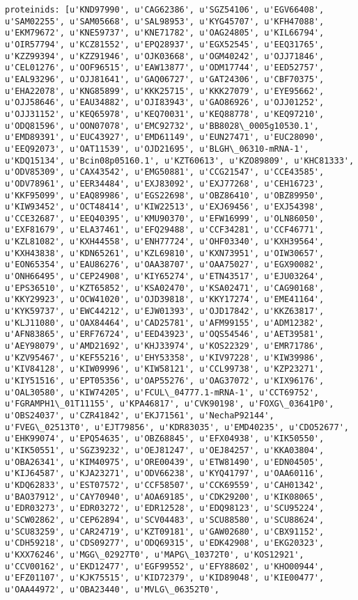 \documentclass[11pt]{article}
\begin{document}
\begin{Verbatim}[commandchars=\\\{\}]
proteinids: [u'KND97990', u'CAG62386', u'SGZ54106', u'EGV66408', u'SAM02255', u'SAM05668', u'SAL98953', u'KYG45707', u'KFH47088', u'EKM79672', u'KNE59737', u'KNE71782', u'OAG24805', u'KIL66794', u'OIR57794', u'KCZ81552', u'EPQ28937', u'EGX52545', u'EEQ31765', u'KZZ99394', u'KZZ91946', u'OJK03668', u'OGM40242', u'OJJ71846', u'CEL01276', u'OOF96515', u'EAW13877', u'ODM17744', u'EED52757', u'EAL93296', u'OJJ81641', u'GAQ06727', u'GAT24306', u'CBF70375', u'EHA22078', u'KNG85899', u'KKK25715', u'KKK27079', u'EYE95662', u'OJJ58646', u'EAU34882', u'OJI83943', u'GAO86926', u'OJJ01252', u'OJJ31152', u'KEQ65978', u'KEQ70031', u'KEQ88778', u'KEQ97210', u'ODQ81596', u'OON07078', u'EMC92732', u'BB8028\_0005g10530.1', u'EMD89391', u'EUC43927', u'EMD61149', u'EUN27471', u'EUC28090', u'EEQ92073', u'OAT11539', u'OJD21695', u'BLGH\_06310-mRNA-1', u'KDQ15134', u'Bcin08p05160.1', u'KZT60613', u'KZO89809', u'KHC81333', u'ODV85309', u'CAX43542', u'EMG50881', u'CCG21547', u'CCE43585', u'ODV78961', u'EER34484', u'EXJ83092', u'EXJ77268', u'CEH16723', u'KKF95099', u'EAQ89986', u'EGS22698', u'OBZ86410', u'OBZ89950', u'KIW93452', u'OCT48414', u'KIW22513', u'EXJ69456', u'EXJ54398', u'CCE32687', u'EEQ40395', u'KMU90370', u'EFW16999', u'OLN86050', u'EXF81679', u'ELA37461', u'EFQ29488', u'CCF34281', u'CCF46771', u'KZL81082', u'KXH44558', u'ENH77724', u'OHF03340', u'KXH39564', u'KXH43838', u'KDN65261', u'KZL69810', u'KXN73951', u'OIW30657', u'EON65354', u'EAU86276', u'OAA38707', u'OAA75027', u'EGX90082', u'ONH66495', u'CEP24908', u'KIY65274', u'ETN43517', u'EJU03264', u'EPS36510', u'KZT65852', u'KSA02470', u'KSA02471', u'CAG90168', u'KKY29923', u'OCW41020', u'OJD39818', u'KKY17274', u'EME41164', u'KYK59737', u'EWC44212', u'EJW01393', u'OJD17842', u'KKZ63817', u'KLJ11080', u'OAX84464', u'CAD25781', u'AFM99155', u'ADM12382', u'AFN83865', u'ERF76724', u'EED43923', u'OQS54546', u'AET39581', u'AEY98079', u'AMD21692', u'KHJ33974', u'KOS22329', u'EMR71786', u'KZV95467', u'KEF55216', u'EHY53358', u'KIV97228', u'KIW39986', u'KIV84128', u'KIW09996', u'KIW58121', u'CCL99738', u'KZP23271', u'KIY51516', u'EPT05356', u'OAP55276', u'OAG37072', u'KIX96176', u'OAL30580', u'KIW74205', u'FCUL\_04777.1-mRNA-1', u'CCT69752', u'FGRAMPH1\_01T11155', u'KPA46817', u'CVK90198', u'FOXG\_03641P0', u'OBS24037', u'CZR41842', u'EKJ71561', u'NechaP92144', u'FVEG\_02513T0', u'EJT79856', u'KDR83035', u'EMD40235', u'CDO52677', u'EHK99074', u'EPQ54635', u'OBZ68845', u'EFX04938', u'KIK50550', u'KIK50551', u'SGZ39232', u'OEJ81247', u'OEJ84257', u'KKA03804', u'OBA26341', u'KIM40975', u'ORE00439', u'ETW81490', u'EDN04505', u'KIJ64587', u'KJA23271', u'ODV66238', u'KYQ41797', u'OAA60116', u'KDQ62833', u'EST07572', u'CCF58507', u'CCK69559', u'CAH01342', u'BAO37912', u'CAY70940', u'AOA69185', u'CDK29200', u'KIK08065', u'EDR03273', u'EDR03272', u'EDR12528', u'EDQ98123', u'SCU95224', u'SCW02862', u'CEP62894', u'SCV04483', u'SCU88580', u'SCU88624', u'SCU83259', u'CAR24719', u'KZT09181', u'GAW02680', u'CBX91152', u'CDH59218', u'CDS09277', u'ODQ69315', u'EDK42908', u'EKG20323', u'KXX76246', u'MGG\_02927T0', u'MAPG\_10372T0', u'KOS12921', u'CCV00162', u'EKD12477', u'EGF99552', u'EFY88602', u'KHO00944', u'EFZ01107', u'KJK75515', u'KID72379', u'KID89048', u'KIE00477', u'OAA44972', u'OBA23440', u'MVLG\_06352T0', 
\end{Verbatim}
\end{document}
